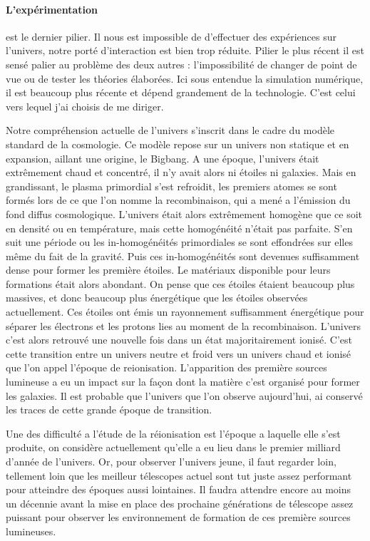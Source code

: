 \paragraph{L'expérimentation} est le dernier pilier.
Il nous est impossible de d'effectuer des expériences sur l'univers, notre porté d'interaction est bien trop réduite.
Pilier le plus récent il est sensé palier au problème des deux autres : l'impossibilité de changer de point de vue ou de tester les théories élaborées.
Ici sous entendue la simulation numérique, il est beaucoup plus récente et dépend grandement de la technologie.
C'est celui vers lequel j'ai choisis de me diriger.






Notre compréhension actuelle de l'univers s'inscrit dans le cadre du modèle standard de la cosmologie.
Ce modèle repose sur un univers non statique et en expansion, aillant une origine, le Bigbang.
A une époque, l'univers était extrêmement chaud et concentré, il n'y avait alors ni étoiles ni galaxies.
Mais en grandissant,  le plasma primordial s'est refroidit, les premiers atomes se sont formés lors de ce que l'on nomme la recombinaison, qui a mené a l'émission du fond diffus cosmologique.
L'univers était alors extrêmement homogène que ce soit en densité ou en température, mais cette homogénéité n'était pas parfaite.
S'en suit une période ou les in-homogénéités primordiales se sont effondrées sur elles même du fait de la gravité.
Puis ces in-homogénéités sont devenues suffisamment dense pour former les première étoiles.
Le matériaux disponible pour leurs formations était alors abondant.
On pense que ces étoiles étaient beaucoup plus massives, et donc beaucoup plus énergétique que les étoiles observées actuellement.
Ces étoiles ont émis un rayonnement suffisamment énergétique pour séparer les électrons et les protons lies au moment de la recombinaison.
L'univers c'est alors retrouvé une nouvelle fois dans un état majoritairement ionisé. 
C'est cette transition entre un univers neutre et froid vers un univers chaud et ionisé que l'on appel l'époque de reionisation.
L'apparition des première sources lumineuse a eu un impact sur la façon dont la matière c'est organisé pour former les galaxies.
Il est probable que l'univers que l'on observe aujourd'hui, ai conservé les traces de cette grande époque de transition.

Une des difficulté a l'étude de la réionisation est l'époque a laquelle elle s'est produite, on considère actuellement qu'elle a eu lieu dans le premier milliard d'année de l'univers.
Or, pour observer l'univers jeune, il faut regarder loin, tellement loin que les meilleur télescopes actuel sont tut juste assez performant pour atteindre des époques aussi lointaines.
Il faudra attendre encore au moins un décennie avant la mise en place des prochaine générations de télescope assez puissant pour observer les environnement de formation de ces première sources lumineuses.

